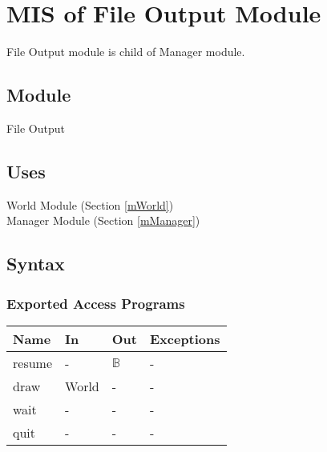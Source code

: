 \documentclass[12pt, titlepage]{article}
\begin{document}

\newpage

\section{MIS of File Output Module} \label{mFileOutput} 

File Output module is child of Manager module.



\subsection{Module}

File Output

\subsection{Uses}
World Module (Section \ref{mWorld}) \\
Manager Module (Section \ref{mManager})

\subsection{Syntax}


\subsubsection{Exported Access Programs}

\begin{center}
\begin{tabular}{p{2cm} p{4cm} p{4cm} p{2cm}}
\hline
\textbf{Name} & \textbf{In} & \textbf{Out} & \textbf{Exceptions} \\
\hline
resume & -     & $\mathbb{B}$ & - \\
draw   & World & - & - \\
wait   & -     & - & - \\
quit   & -     & - & - \\\hline\hline
\end{tabular}
\end{center}
\end{document}
